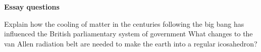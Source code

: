\documentclass{exam}
\begin{document}
\begin{EnvFullwidth}
\Large \textbf{Essay questions}
\end{EnvFullwidth}

\begin{questions}
\question
Explain how the cooling of matter in the centuries following the big
bang has influenced the British parliamentary system of government
\fillwithlines{2in}
\question
What changes to the van Allen radiation belt are needed to make
the earth into a regular icosahedron?
\fillwithlines{1in}
\end{questions}
\end{document}
